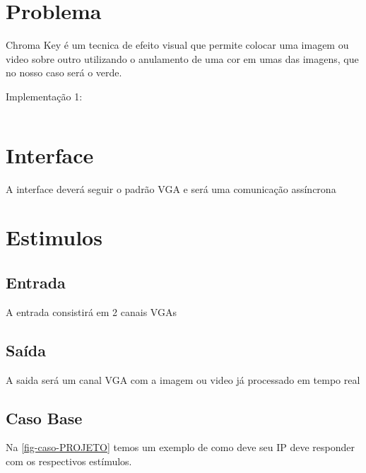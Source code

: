 \documentclass[
    12pt,
    a4paper,
    oneside,
    chapter=TITLE,
    section=TITLE,
    subsection=TITLE,
    subsubsection=TITLE,
    english,
    french,
    spanish,
    brazil,
    ]{abntex2}
\begin{document}
\frenchspacing 
\imprimircapa
\imprimirfolhaderosto

\tableofcontents*
\cleardoublepage

\textual

\chapter{Problema}
Chroma Key é um tecnica de efeito visual que permite colocar uma imagem ou video sobre outro utilizando o anulamento de uma cor em umas das imagens, que no nosso caso será o verde.

\par
Implementação 1:
\begin{lstlisting}

\end{lstlisting}

\chapter{Interface}
A interface deverá seguir o padrão VGA e será uma comunicação assíncrona

\chapter{Estimulos}
\section{Entrada}
A entrada consistirá em 2 canais VGAs

\section{Saída}
A saida será um canal VGA com a imagem ou video já processado em tempo real

\section{Caso Base}
Na \autoref{fig-caso-PROJETO} temos um exemplo de como deve seu IP deve responder com os respectivos estímulos.
\end{document}
